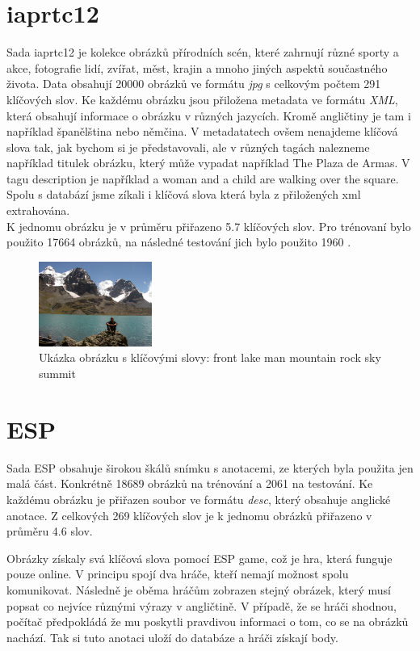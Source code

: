 \documentclass[czech,BP]{thesiskiv}
\begin{document}
\section{iaprtc12}
\par Sada iaprtc12 je kolekce obrázků přírodních scén, které zahrnují různé sporty a akce, fotografie lidí, zvířat, měst, krajin a mnoho jiných aspektů součastného života. Data obsahují \num{20 000} obrázků ve formátu \textit{jpg} s celkovým počtem \num{291} klíčových slov. Ke každému obrázku jsou přiložena metadata ve formátu \textit{XML}, která obsahují informace o obrázku v různých jazycích. Kromě angličtiny je tam i například španělština nebo němčina. V metadatatech ovšem nenajdeme klíčová slova tak, jak bychom si je představovali, ale v různých tagách nalezneme například titulek obrázku, který může vypadat například The Plaza de Armas. V tagu description je například  a woman and a child are walking over the square. Spolu s databází jsme zíkali i klíčová slova která byla z přiložených xml extrahována.\\
K jednomu obrázku je v průměru přiřazeno \num{5.7} klíčových slov. Pro trénovaní bylo použito \num{17 664} obrázků, na následné testování jich bylo použito \num{1960} \cite{ESPvon2004labeling}. 


\begin{figure}[h]
		\centering
		\includegraphics[width=140px]{./img/iaprtc12.jpg}	
		\caption{Ukázka obrázku s klíčovými slovy: front lake man mountain rock sky summit}
\end{figure}

\section{ESP}
\par Sada ESP obsahuje širokou škálů snímku s anotacemi, ze kterých byla použita jen malá část. Konkrétně \num{18 689} obrázků na trénování a \num{2061} na testování. Ke každému obrázku je přiřazen soubor ve formátu \textit{desc}, který obsahuje anglické anotace. Z celkových 269 klíčových slov je k jednomu obrázků přiřazeno v průměru 4.6 slov.

\par Obrázky získaly svá klíčová slova pomocí ESP game, což je hra, která funguje pouze online. V principu spojí dva hráče, kteří nemají možnost spolu komunikovat. Následně je oběma hráčům zobrazen stejný obrázek, který musí popsat co nejvíce různými výrazy v angličtině. V případě, že se hráči shodnou, počítač předpokládá že mu poskytli pravdivou informaci o tom, co se na obrázků nachází. Tak si tuto anotaci uloží do databáze a hráči získají body.
\end{document}
